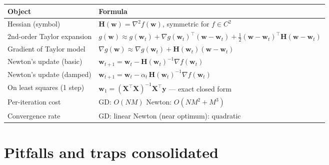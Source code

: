 \documentclass[11pt, a4paper]{article}
\newcommand{\thead}[1]{\textbf{#1}}
\begin{document}
\begin{tabularx}{\linewidth}{@{}lX@{}}
\toprule
\thead{Object} & \thead{Formula} \\
\midrule
Hessian (symbol)            & $\mathbf{H}(\mathbf{w}) = \nabla^2 f(\mathbf{w})$, symmetric for $f\in C^2$ \\
2nd-order Taylor expansion  & $g(\mathbf{w}) \approx g(\mathbf{w}_t) + \nabla g(\mathbf{w}_t)^\top(\mathbf{w}-\mathbf{w}_t) + \tfrac{1}{2}(\mathbf{w}-\mathbf{w}_t)^\top\mathbf{H}(\mathbf{w}-\mathbf{w}_t)$ \\
Gradient of Taylor model    & $\nabla g(\mathbf{w}) \approx \nabla g(\mathbf{w}_t) + \mathbf{H}(\mathbf{w}_t)(\mathbf{w}-\mathbf{w}_t)$ \\
Newton's update (basic)     & $\mathbf{w}_{t+1} = \mathbf{w}_t - \mathbf{H}(\mathbf{w}_t)^{-1}\nabla f(\mathbf{w}_t)$ \\
Newton's update (damped)    & $\mathbf{w}_{t+1} = \mathbf{w}_t - \alpha_t\,\mathbf{H}(\mathbf{w}_t)^{-1}\nabla f(\mathbf{w}_t)$ \\
On least squares (1 step)   & $\mathbf{w}_1 = (\mathbf{X}^\top\mathbf{X})^{-1}\mathbf{X}^\top\mathbf{y}$ — exact closed form \\
Per-iteration cost          & GD: $O(NM)$ \quad Newton: $O(NM^2 + M^3)$ \\
Convergence rate            & GD: linear \quad Newton (near optimum): quadratic \\
\bottomrule
\end{tabularx}

\section*{Pitfalls and traps consolidated}
\end{document}
